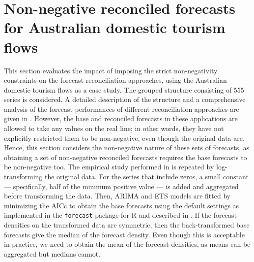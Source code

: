 \documentclass[11pt]{article}
\newcommand{\0}{\phantom{0}}
\begin{document}
%
%

\section{Non-negative reconciled forecasts for Australian domestic tourism flows}
\label{sec:AUSNN}
This section evaluates the impact of imposing the strict non-negativity constraints on the forecast reconciliation approaches, using the Australian domestic tourism flows as a case study. The grouped structure consisting of 555 series is considered. A detailed description of the structure and a comprehensive analysis of the forecast performances of different reconciliation approaches are given in \citet{Wick2018}. However, the base and reconciled forecasts in these applications are allowed to take any values on the real line; in other words, they have not explicitly restricted them to be non-negative, even though the original data are. Hence, this section considers the non-negative nature of these sets of forecasts, as obtaining a set of non-negative reconciled forecasts requires the base forecasts to be non-negative too. The empirical study performed in \citet{Wick2018} is repeated by log-transforming the original data. For the series that include zeros, a small constant --- specifically, half of the minimum positive value --- is added and aggregated before transforming the data. Then, ARIMA and ETS models are fitted by minimizing the AICc to obtain the base forecasts using the default settings as implemented in the \texttt{forecast} package for R \citet{forecast2016} and described in \citet{Hyndman2008}. If the forecast densities on the transformed data are symmetric, then the back-transformed base forecasts give the median of the forecast density. Even though this is acceptable in practice, we need to obtain the mean of the forecast densities, as means can be aggregated but medians cannot.
\end{document}
